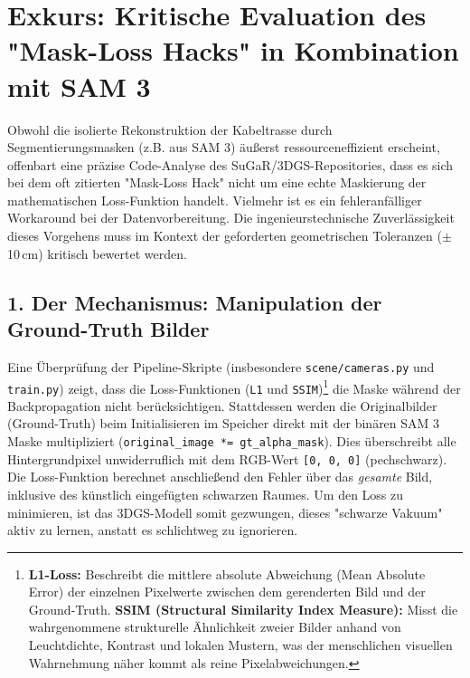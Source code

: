 \documentclass[12pt,a4paper]{article}
\begin{document}
\section*{Exkurs: Kritische Evaluation des "Mask-Loss Hacks" in Kombination mit SAM 3}
\label{sec:mask_loss_hack}

Obwohl die isolierte Rekonstruktion der Kabeltrasse durch Segmentierungsmasken (z.B. aus SAM 3) äußerst ressourceneffizient erscheint, offenbart eine präzise Code-Analyse des SuGaR/3DGS-Repositories, dass es sich bei dem oft zitierten "Mask-Loss Hack" nicht um eine echte Maskierung der mathematischen Loss-Funktion handelt. Vielmehr ist es ein fehleranfälliger Workaround bei der Datenvorbereitung. Die ingenieurstechnische Zuverlässigkeit dieses Vorgehens muss im Kontext der geforderten geometrischen Toleranzen ($\pm$ 10\,cm) kritisch bewertet werden.

\subsection*{1. Der Mechanismus: Manipulation der Ground-Truth Bilder}
Eine Überprüfung der Pipeline-Skripte (insbesondere \texttt{scene/cameras.py} und \texttt{train.py}) zeigt, dass die Loss-Funktionen (\texttt{L1} und \texttt{SSIM})\footnote{\textbf{L1-Loss:} Beschreibt die mittlere absolute Abweichung (Mean Absolute Error) der einzelnen Pixelwerte zwischen dem gerenderten Bild und der Ground-Truth. \textbf{SSIM (Structural Similarity Index Measure):} Misst die wahrgenommene strukturelle Ähnlichkeit zweier Bilder anhand von Leuchtdichte, Kontrast und lokalen Mustern, was der menschlichen visuellen Wahrnehmung näher kommt als reine Pixelabweichungen.} die Maske während der Backpropagation nicht berücksichtigen. Stattdessen werden die Originalbilder (Ground-Truth) beim Initialisieren im Speicher direkt mit der binären SAM 3 Maske multipliziert (\texttt{original\_image *= gt\_alpha\_mask}). Dies überschreibt alle Hintergrundpixel unwiderruflich mit dem RGB-Wert \texttt{[0, 0, 0]} (pechschwarz). Die Loss-Funktion berechnet anschließend den Fehler über das \textit{gesamte} Bild, inklusive des künstlich eingefügten schwarzen Raumes. Um den Loss zu minimieren, ist das 3DGS-Modell somit gezwungen, dieses "schwarze Vakuum" aktiv zu lernen, anstatt es schlichtweg zu ignorieren.
\end{document}
